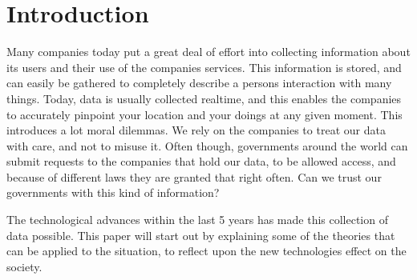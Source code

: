 \section{Introduction}
Many companies today put a great deal of effort into collecting information about its users and their use of the companies services. This information is stored, and can easily be gathered to completely describe a persons interaction with many things. Today, data is usually collected realtime, and this enables the companies to accurately pinpoint your location and your doings at any given moment. This introduces a lot moral dilemmas. We rely on the companies to treat our data with care, and not to misuse it. Often though, governments around the world can submit requests to the companies that hold our data, to be allowed access, and because of different laws they are granted that right often. Can we trust our governments with this kind of information?

The technological advances within the last 5 years has made this collection of data possible.
This paper will start out by explaining some of the theories that can be applied to the situation, to reflect upon the new technologies effect on the society.
\newpage
